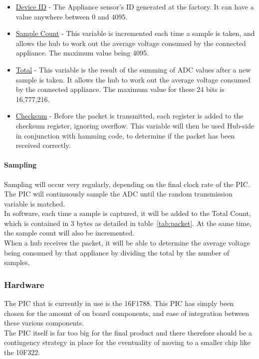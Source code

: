 \documentclass[preprint,12pt,3p]{elsarticle}
\begin{document}
\begin{itemize}
\item \underline{Device ID} - The Appliance sensor's ID generated at the factory. It can have a value anywhere between 0 and 4095.
\item \underline{Sample Count} - This variable is incremented each time a sample is taken, and allows the hub to work out the average voltage consumed by the connected appliance. The maximum value being 4095.
\item \underline{Total} - This variable is the result of the summing of ADC values after a new sample is taken. It allows the hub to work out the average voltage consumed by the connected appliance. The maximum value for these 24 bits is 16,777,216.
\item \underline{Checksum} - Before the packet is transmitted, each register is added to the checksum register, ignoring overflow. This variable will then be used Hub-side in conjunction with hamming code, to determine if the packet has been received correctly.
\end{itemize}

\paragraph{Sampling}
Sampling will occur very regularly, depending on the final clock rate of the PIC.\\
The PIC will continuously sample the ADC until the random transmission variable is matched.\\
In software, each time a sample is captured, it will be added to the Total Count, which is contained in 3 bytes as detailed in table~\ref{tab:packet}. At the same time, the sample count will also be incremented. \\
When a hub receives the packet, it will be able to determine the average voltage being consumed by that appliance by dividing the total by the number of samples.

\subsubsection{Hardware}
The PIC that is currently in use is the 16F1788. This PIC has simply been chosen for the amount of on board components, and ease of integration between these various components.\\
The PIC itself is far too big for the final product and there therefore should be a contingency strategy in place for the eventuality of moving to a smaller chip like the 10F322.
\end{document}
